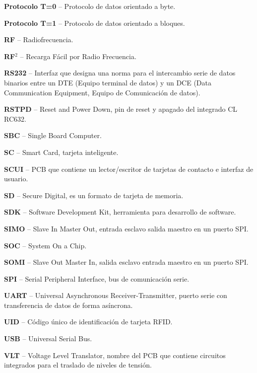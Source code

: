 \begin{glosario}
{\bf{Protocolo T=0}} – Protocolo de datos orientado a byte.

{\bf{Protocolo T=1}} – Protocolo de datos orientado a bloques.

{\bf{RF}} – Radiofrecuencia.

{\bf{RF$^{2}$}} – Recarga Fácil por Radio Frecuencia.

{\bf{RS232}} – Interfaz que designa una norma para el intercambio serie de datos binarios entre un DTE (Equipo terminal de datos) y un DCE (Data Communication Equipment, Equipo de Comunicación de datos).

{\bf{RSTPD}} – Reset and Power Down, pin de reset y apagado del integrado CL RC632.

{\bf{SBC}} – Single Board Computer.

{\bf{SC}} – Smart Card, tarjeta inteligente.

{\bf{SCUI}} – PCB que contiene un lector/escritor de tarjetas de contacto e interfaz de usuario.

{\bf{SD}} – Secure Digital, es un formato de tarjeta de memoria.

{\bf{SDK}} – Software Development Kit, herramienta para desarrollo de software.

{\bf{SIMO}} – Slave In Master Out, entrada esclavo salida maestro en un puerto SPI.

{\bf{SOC}} – System On a Chip.

{\bf{SOMI}} – Slave Out Master In, salida esclavo entrada maestro en un puerto SPI.

{\bf{SPI}} – Serial Peripheral Interface, bus de comunicación serie.

{\bf{UART}} – Universal Asynchronous Receiver-Transmitter, puerto serie con transferencia de datos de forma asíncrona.

{\bf{UID}} – Código único de identificación de tarjeta RFID.

{\bf{USB}} – Universal Serial Bus.

{\bf{VLT}} – Voltage Level Translator, nombre del PCB que contiene circuitos integrados para el traslado de niveles de tensión.

\end{glosario}
